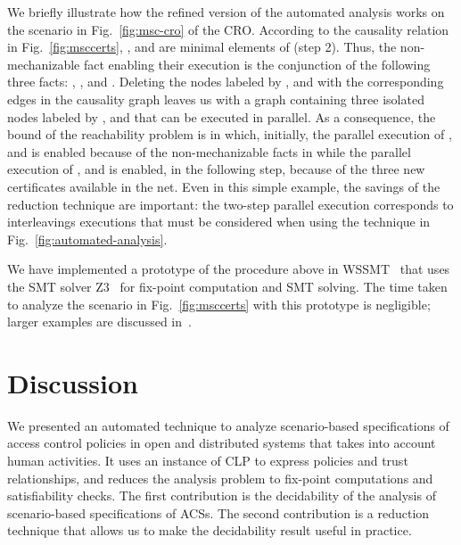 \documentclass[conference]{llncs}
\newcommand{\CRO}{CRO}
\begin{document}
{We briefly illustrate how the refined version of the automated
analysis works on the scenario in Fig.~\ref{fig:msc-cro} of the
\CRO{}.  According to the causality relation in
Fig.~\ref{fig:msccerts}, , and  are minimal
elements of  (step 2).  Thus, the non-mechanizable fact
 enabling their execution is the conjunction of the following
three facts: ,
, and .  Deleting the nodes labeled by , and  with the corresponding edges in the causality
graph leaves us with a graph containing three isolated nodes labeled
by , and  that can be executed in parallel.
As a consequence, the bound of the reachability problem is  in
which, initially, the parallel execution of , and
 is enabled because of the non-mechanizable facts in 
while the parallel execution of , and  is
enabled, in the following step, because of the three new certificates
available in the net.  Even in this simple example, the savings of the
reduction technique are important: the two-step parallel execution
corresponds to 
 interleavings executions that must be considered
when using the technique in Fig.~\ref{fig:automated-analysis}.

We have implemented a prototype of the procedure above in
WSSMT~\cite{BCRVZ} that uses the SMT solver Z3~\cite{z3} for fix-point
computation and SMT solving.  The time taken to analyze the scenario
in Fig.~\ref{fig:msccerts} with this prototype is negligible; larger
examples are discussed in~\cite{BCRVZ}.

\section{Discussion}
\label{sec:conclusions}
We presented an automated technique to analyze scenario-based
specifications of access control policies in open and distributed
systems that takes into account human activities.  It uses an instance
of CLP to express policies and trust relationships, and reduces the
analysis problem to fix-point computations and satisfiability checks.
The first contribution is the decidability of the analysis of
scenario-based specifications of ACSs.  The second contribution is a
reduction technique that allows us to make the decidability result
useful in practice.\\






}
\end{document}
